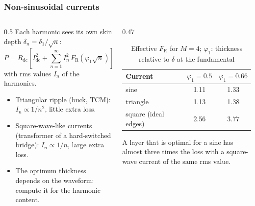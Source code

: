 \begin{frame}
	\frametitle{Non-sinusoidal currents}
	\begin{columns}[T]
		\begin{column}{0.5\textwidth}
			\small
			Each harmonic sees its own skin depth $\delta_n=\delta_1/\sqrt{n}$:
			\begin{equation*}
				P=R_\mathrm{dc}\left[I_\mathrm{dc}^2+\sum_{n=1}^{\infty}I_n^2\,F_\mathrm{R}\!\left(\varphi_1\sqrt{n}\right)\right]
			\end{equation*}
			with rms values $I_n$ of the harmonics.
			\begin{itemize}
				\item Triangular ripple (buck, TCM): $I_n\propto1/n^2$, little extra loss.
				\item Square-wave-like currents (transformer of a hard-switched bridge): $I_n\propto1/n$, large extra loss.
				\item The optimum thickness depends on the waveform: compute it for the harmonic content.
			\end{itemize}
		\end{column}
		\begin{column}{0.47\textwidth}
			\begin{table}
				\centering
				\footnotesize
				\begin{tabular}{|l|c|c|}
					\hline
					\textbf{Current}      & $\varphi_1=0.5$ & $\varphi_1=0.66$ \\
					\hline
					sine                  & 1.11            & 1.33             \\
					triangle              & 1.13            & 1.38             \\
					square (ideal edges)  & 2.56            & 3.77             \\
					\hline
				\end{tabular}
				\caption{Effective $F_\mathrm{R}$ for $M=4$; $\varphi_1$: thickness relative to $\delta$ at the fundamental}
			\end{table}
			\small
			A layer that is optimal for a sine has almost three times the loss with a square-wave current of the same rms value.
		\end{column}
	\end{columns}
\end{frame}

